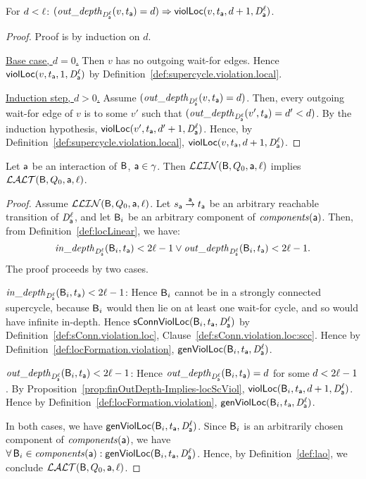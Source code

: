 \begin{proposition}
\label{prop:finOutDepth-Implies-locScViol}
For $d < \l$: $(\wodepth{\dsk{\act}{\l}}{v}{t_\act} = d)  \imp \locScViol{v}{d+1}{t_\act}{\act}{\l}$.
\end{proposition}
%
\begin{proof}
Proof is by induction on $d$. 

\ul{Base case, $d=0$.}
Then $v$ has no outgoing wait-for edges. Hence $\locScViol{v}{1}{t_\act}{\act}{\l}$ by Definition~\ref{def:supercycle.violation.local}.

\ul{Induction step, $d > 0$.}
Assume $(\wodepth{\dsk{\act}{\l}}{v}{t_\act} = d)$. Then, every outgoing wait-for edge of $v$ is to some $v'$ such that 
$(\wodepth{\dsk{\act}{\l}}{v'}{t_\act} = d' < d)$. By the induction hypothesis, $\locScViol{v'}{d'+1}{t_\act}{\act}{\l}$.
Hence, by Definition~\ref{def:supercycle.violation.local},  $\locScViol{v}{d+1}{t_\act}{\act}{\l}$.
\end{proof}


\begin{lemma}
\label{lemma:locLinear-implies-locANDOR}
\label{LLinLAO}
Let $\act$ be an interaction of $\B$, \ie $\act \in \gamma$.
Then $\LLin(\B, Q_0, \act, \l)$ implies $\LAO(\B, Q_0, \act, \l)$.
\end{lemma}
%
\begin{proof}
Assume $\LLin(\B, Q_0, \act, \l)$. Let $s_\act \goesto[\act] t_\act$ be an arbitrary reachable transition of $\dsk{\act}{\l}$,
and let $\B_i$ be an arbitrary component of $\cmps{\act}$.
Then, from Definition~\ref{def:locLinear}, we have:
  $$\widepth{\dsk{\act}{\l}}{\B_i}{t_\act} < 2\l-1 \lor \wodepth{\dsk{\act}{\l}}{\B_i}{t_\act} < 2\l-1.$$
The proof proceeds by two cases. 

\ul{ $\widepth{\dsk{\act}{\l}}{\B_i}{t_\act} < 2\l-1$}:
Hence $\B_i$ cannot be in a strongly connected supercycle, because $\B_i$ would then lie on at least one wait-for cycle, and so would have infinite
in-depth. Hence $\locConnViol{\B_i}{t_\act}{\act}{\l}$ by Definition~\ref{def:sConn.violation.loc}, Clause~\ref{def:sConn.violation.loc:scc}.
Hence by Definition~\ref{def:locFormation.violation}, $\locFormViol{\B_i}{t_\act}{\act}{\l}$.

\ul{$\wodepth{\dsk{\act}{\l}}{\B_i}{t_\act} < 2\l-1$}:
Hence $\wodepth{\dsk{\act}{\l}}{\B_i}{t_\act} = d$ for some $d < 2\l-1$.
By Proposition~\ref{prop:finOutDepth-Implies-locScViol}, $\locScViol{\B_i}{d+1}{t_\act}{\act}{\l}$.
Hence by Definition~\ref{def:locFormation.violation}, $\locFormViol{\B_i}{t_\act}{\act}{\l}$.

\noindent
In both cases, we have $\locFormViol{\B_i}{t_\act}{\act}{\l}$.
Since $\B_i$ is an arbitrarily chosen  component of $\cmps{\act}$, we have $\fa \B_i \in \cmps{\act} : \locFormViol{\B_i}{t_\act}{\act}{\l}$.
Hence, by Definition~\ref{def:lao}, we conclude $\LAO(\B, Q_0, \act, \l)$.
\end{proof}



